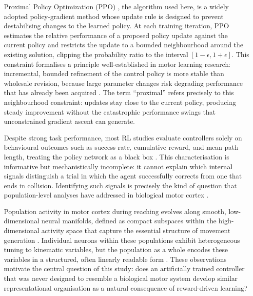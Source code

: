 \documentclass{article}
\begin{document}
Proximal Policy Optimization (PPO) \citep{Schulman2017}, the algorithm
used here, is a widely adopted policy-gradient method whose update rule is
designed to prevent destabilising changes to the learned policy.
At each training iteration, PPO estimates the relative performance of a
proposed policy update against the current policy and restricts the update
to a bounded neighbourhood around the existing solution, clipping the
probability ratio to the interval $[1-\epsilon, 1+\epsilon]$.
This constraint formalises a principle well-established in motor learning
research: incremental, bounded refinement of the control policy is more
stable than wholesale revision, because large parameter changes risk
degrading performance that has already been acquired \citep{Oby2019,SuttonBarto2018,Heald2021,Krakauer2019}.
The term ``proximal'' refers precisely to this neighbourhood constraint:
updates stay close to the current policy, producing steady improvement
without the catastrophic performance swings that unconstrained gradient
ascent can generate.

Despite strong task performance, most RL studies evaluate controllers
solely on behavioural outcomes such as success rate, cumulative reward,
and mean path length, treating the policy network as a black box
\citep{Rudin2019,Molnar2022}.
This characterisation is informative but mechanistically incomplete: it
cannot explain which internal signals distinguish a trial in which the
agent successfully corrects from one that ends in collision.
Identifying such signals is precisely the kind of question that
population-level analyses have addressed in biological motor cortex
\citep{Churchland2012,Cunningham2014,Gallego2017,Blohm2009}.

Population activity in motor cortex during reaching evolves along smooth,
low-dimensional neural manifolds, defined as compact subspaces within the
high-dimensional activity space that capture the essential structure of
movement generation
\citep{Churchland2012,Shenoy2013,Cunningham2014,Gallego2017,Sadtler2014,Elsayed2016,Kaufman2014}.
Individual neurons within these populations exhibit heterogeneous tuning
to kinematic variables, but the population as a whole encodes these
variables in a structured, often linearly readable form
\citep{Oby2019,Blohm2009,Georgopoulos1986,Perich2018}.
These observations motivate the central question of this study: does an
artificially trained controller that was never designed to resemble a
biological motor system develop similar representational organisation as a
natural consequence of reward-driven learning?
\end{document}
